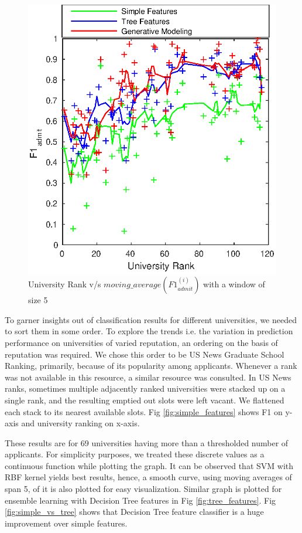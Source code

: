 \documentclass{sig-alternate-05-2015}
\begin{document}
\begin{figure}[t]
\centering
\includegraphics[scale=0.8]{rank_vs_simple_tree_em.eps}
\caption{University Rank v/s $moving\_average(F1^{(i)}_{admit})$ with a window of size 5}
\label{fig:rank_simple_tree_em}
\end{figure}

To garner insights out of classification results for different universities, we needed to sort them in some order. To explore the trends i.e. the variation in prediction performance on universities of varied reputation, an ordering on the basis of reputation was required. We chose this order to be US News Graduate School Ranking, primarily, because of its popularity among applicants. Whenever a rank was not available in this resource, a similar resource was consulted. In US News ranks, sometimes multiple adjacently ranked universities were stacked up on a single rank, and the resulting emptied out slots were left vacant. We flattened each stack to its nearest available slots. Fig \ref{fig:simple_features} shows F1 on y-axis and university ranking on x-axis.

These results are for 69 universities having more than a thresholded number of applicants. For simplicity purposes, we treated these discrete values as a continuous function while plotting the graph. It can be observed that SVM with RBF kernel yields best results, hence, a smooth curve, using moving averages of span 5, of it is also plotted for easy visualization. Similar graph is plotted for ensemble learning with Decision Tree features in Fig \ref{fig:tree_features}. Fig \ref{fig:simple_vs_tree} shows that Decision Tree feature classifier is a huge improvement over simple features.
\end{document}
